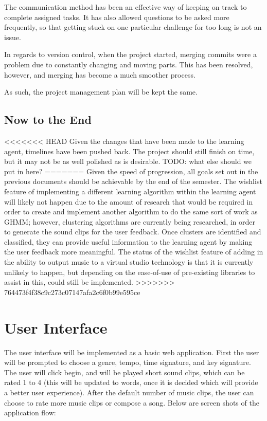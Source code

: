 \documentclass{article}
\begin{document}
The communication method has been an effective way of keeping on track to complete assigned tasks. 
It has also allowed questions to be asked more frequently, so that getting stuck on one particular 
challenge for too long is not an issue.

In regards to version control, when the project started, merging commits were a problem due to constantly 
changing and moving parts. This has been resolved, however, and merging has become a much smoother process.

As such, the project management plan will be kept the same.

\subsection{Now to the End}
<<<<<<< HEAD
Given the changes that have been made to the learning agent, timelines have been pushed back. The project
should still finish on time, but it may not be as well polished as is desirable.
\Large{TODO: what else should we put in here?}
=======
Given the speed of progression, all goals set out in the previous documents should be achievable
by the end of the semester. The wishlist feature of implementing a different learning algorithm
within the learning agent will likely not happen due to the amount of research that would be 
required in order to create and implement another algorithm to do the same sort of work as GHMM; 
however, clustering algorithms are currently being researched, in order to generate the sound 
clips for the user feedback. Once clusters are identified and classified, they can provide useful 
information to the learning agent by making the user feedback more meaningful. The status of the 
wishlist feature of adding in the ability to output music to a virtual studio technology is that 
it is currently unlikely to happen, but depending on the ease-of-use of pre-existing libraries 
to assist in this, could still be implemented.
>>>>>>> 764473f4f38c9c273c07147afa2c6f0b99e595ce

\section{User Interface}
The user interface will be implemented as a basic web application. First the user will be prompted 
to choose a genre, tempo, time signature, and key signature.  The user will click begin, and will 
be played short sound clips, which can be rated 1 to 4 (this will be updated to words, once it is 
decided which will provide a better user experience).  After the default number of music clips, the 
user can choose to rate more music clips or compose a song.  
Below are screen shots of the application flow:
\end{document}
